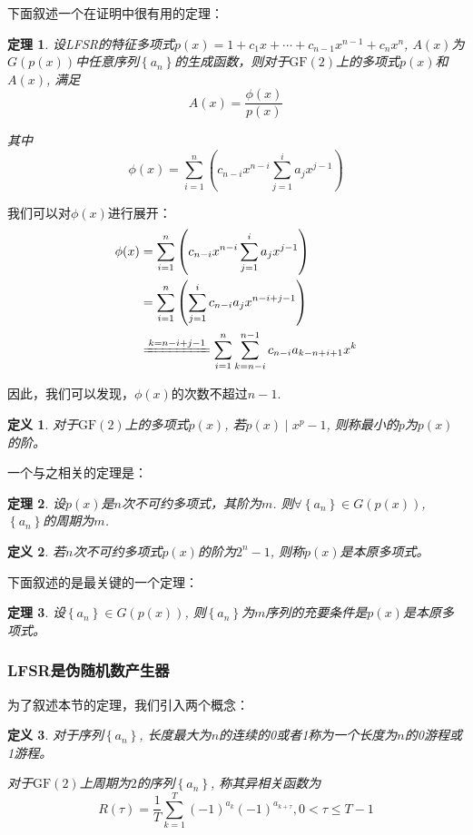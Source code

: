 \documentclass[UTF8]{ctexrep}
\def\pth#1{\left( {#1}\right)}
\def\brace#1{\left\{ {#1} \right\}}
\def\GF{\mathrm{GF}}
\newtheorem{Definition}{\hspace{2em}定义}[chapter]
\newtheorem{theorem}{\hspace{2em}定理}[chapter]
\begin{document}
下面叙述一个在证明中很有用的定理：
\begin{theorem}
设LFSR的特征多项式$p(x)=1+c_1x+\cdots +c_{n-1}x^{n-1}+c_nx^n$, $A\pth{x}$为$G\pth{p(x)}$中任意序列$\brace{a_n}$的生成函数，则对于$\GF\pth{2}$上的多项式$p(x)$和$A(x)$, 满足
\begin{equation}
    A(x)=\frac{\phi(x)}{p(x)}
\end{equation}

其中
\begin{equation}
    \phi(x)=\sum_{i=1}^n\pth{c_{n-i}x^{n-i}\sum_{j=1}^ia_jx^{j-1}}
\end{equation}
\end{theorem}

我们可以对$\phi(x)$进行展开：
\begin{align*}
    \phi(x)&=\sum_{i=1}^n\pth{c_{n-i}x^{n-i}\sum_{j=1}^ia_jx^{j-1}}\\
    &=\sum_{i=1}^n\pth{\sum_{j=1}^ic_{n-i}a_jx^{n-i+j-1}}\\
    &\xlongequal{k=n-i+j-1}\sum_{i=1}^n\sum_{k=n-i}^{n-1}c_{n-i}a_{k-n+i+1}x^k
\end{align*}

因此，我们可以发现，$\phi(x)$的次数不超过$n-1$.
\begin{Definition}
对于$\GF\pth{2}$上的多项式$p(x)$, 若$p(x)\mid x^p-1$, 则称最小的$p$为$p(x)$的阶。
\end{Definition}

一个与之相关的定理是：
\begin{theorem}
设$p(x)$是$n$次不可约多项式，其阶为$m$. 则$\forall \brace{a_n}\in G\pth{p(x)}$, $\brace{a_n}$的周期为$m$.
\end{theorem}
\begin{Definition}
若$n$次不可约多项式$p(x)$的阶为$2^{n}-1$, 则称$p(x)$是本原多项式。
\end{Definition}

下面叙述的是最关键的一个定理：
\begin{theorem}
设$\brace{a_n}\in G\pth{p(x)}$, 则$\brace{a_n}$为$m$序列的充要条件是$p(x)$是本原多项式。
\end{theorem}
\subsubsection{LFSR是伪随机数产生器}
为了叙述本节的定理，我们引入两个概念：
\begin{Definition}
对于序列$\brace{a_n}$, 长度最大为$n$的连续的0或者1称为一个长度为$n$的0游程或1游程。\par
对于$\GF\pth{2}$上周期为$2$的序列$\brace{a_n}$, 称其异相关函数为
\begin{equation}
    R\pth{\tau}=\frac{1}{T}\sum_{k=1}^T\pth{-1}^{a_k}\pth{-1}^{a_{k+\tau}}, 0<\tau\leq T-1
\end{equation}
\end{Definition}
\end{document}
